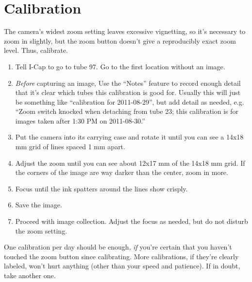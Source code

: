 \documentclass[11pt]{article}
\begin{document}
		
\section{Calibration}
	The camera's widest zoom setting leaves excessive vignetting, so it's necessary to zoom in slightly, but the zoom button doesn't give a reproducibly exact zoom level. Thus, calibrate. 
	
\begin{enumerate}
	\item{Tell I-Cap to go to tube 97. Go to the first location without an image.}
	\item{\textit{Before} capturing an image, Use the ``Notes'' feature to record enough detail that it's clear which tubes this calibration is good for. Usually this will just be something like ``calibration for 2011-08-29'', but add detail as needed, e.g.  ``Zoom switch knocked when detaching from tube 23; this calibration is for images taken after 1:30 PM on 2011-08-30.''}
	\item{Put the camera into its carrying case and rotate it until you can see a 14x18 mm grid of lines spaced 1 mm apart.}
	\item{Adjust the zoom until you can see about 12x17 mm of the 14x18 mm grid. If the corners of the image are way darker than the center, zoom in more.}
	\item{Focus until the ink spatters around the lines show crisply.}
	\item{Save the image.}
	\item{Proceed with image collection. Adjust the focus as needed, but do not disturb the zoom setting.} 
\end{enumerate}
	
	One calibration per day should be enough, \textit{if} you're certain that you haven't touched the zoom button since calibrating. More calibrations, if they're clearly labeled, won't hurt anything (other than your speed and patience). If in doubt, take another one.
\end{document}
